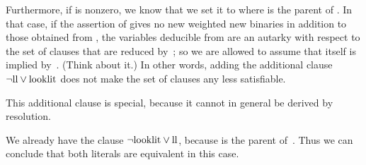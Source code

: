 Furthermore, if  is nonzero, we know
that we
set it to  where  is the parent of %
.
In that case, if the assertion of  gives no new weighted
new binaries in addition to those obtained from , the variables
deducible from  are an autarky with respect to the
set of clauses that are reduced by~; so we are allowed to
assume that  itself is implied by~. (Think about
it.)
In other words,
adding the additional clause $\lnot\hbox{\PB{\\{ll}}}\lor\hbox{\PB{%
\\{looklit}}}$
does not make the set of clauses any less satisfiable.

This additional clause is special, because it cannot in general
be derived by resolution.

We already have the clause $\lnot\hbox{\PB{\\{looklit}}}\lor\hbox{\PB{%
\\{ll}}}$,
because  is the parent of~. Thus we can conclude
that
both literals are equivalent in this case.

